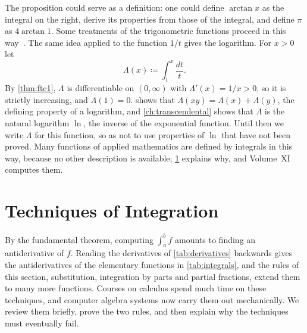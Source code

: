 The proposition could serve as a definition: one could define $\arctan x$ as the integral on the right, derive its properties from those of the integral, and define $\pi$ as $4\arctan1$. Some treatments of the trigonometric functions proceed in this way~\cite{spivak2008calculus}. The same idea applied to the function $1/t$ gives the logarithm. For $x>0$ let
\begin{equation}
\Lambda(x)\coloneqq\int_1^x\frac{dt}t .
\label{eq:log-integral}
\end{equation}
By \cref{thm:ftc1}, $\Lambda$ is differentiable on $(0,\infty)$ with $\Lambda'(x)=1/x>0$, so it is strictly increasing, and $\Lambda(1)=0$.  shows that $\Lambda(xy)=\Lambda(x)+\Lambda(y)$, the defining property of a logarithm, and \cref{ch:transcendental} shows that $\Lambda$ is the natural logarithm $\ln$, the inverse of the exponential function. Until then we write $\Lambda$ for this function, so as not to use properties of $\ln$ that have not been proved. Many functions of applied mathematics are defined by integrals in this way, because no other description is available; \cref{sec:techniques} explains why, and Volume~XI computes them.

\section{Techniques of Integration}
\label{sec:techniques}

By the fundamental theorem, computing $\int_a^bf$ amounts to finding an antiderivative of $f$. Reading the derivatives of \cref{tab:derivatives} backwards gives the antiderivatives of the elementary functions in \cref{tab:integrals}, and the rules of this section, substitution, integration by parts and partial fractions, extend them to many more functions. Courses on calculus spend much time on these techniques, and computer algebra systems now carry them out mechanically. We review them briefly, prove the two rules, and then explain why the techniques must eventually fail.

